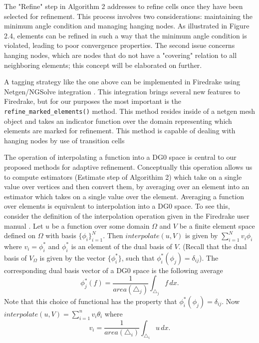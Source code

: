 \documentclass[]{interact}
\theoremstyle{plain}%
\theoremstyle{definition}
\theoremstyle{remark}
\begin{document}
The "Refine" step in Algorithm 2 addresses to refine cells once they have been selected for refinement. This process involves two considerations: maintaining the minimum angle condition and managing hanging nodes. As illustrated in Figure 2.4, elements can be refined in such a way that the minimum angle condition is violated, leading to poor convergence properties. The second issue concerns hanging nodes, which are nodes that do not have a "covering" relation to all neighboring elements; this concept will be elaborated on further.

A tagging strategy like the one above can be implemented in Firedrake using Netgen/NGSolve integration \citep{zerbinati_ngspetsc_nodate}.  This integration brings several new features to Firedrake, but for our purposes the most important is the \texttt{refine\_marked\_elements()} method.  This method resides inside of a netgen mesh object and takes an indicator function over the domain representing which elements are marked for refinement. This method is capable of dealing with hanging nodes by use of transition cells

The operation of interpolating a function into a DG0 space is central to our proposed methods for adaptive refinement. Conceptually this operation allows us to compute estimators (Estimate step of Algorithim 2) which take on a single value over vertices and then convert them, by averaging over an element into an estimator which takes on a single value over the element. Averaging a function over elements is equivalent to interpolation into a DG0 space. To see this, consider the definition of the interpolation operation given in the Firedrake user manual \citep{ham_firedrake_2023}. 
Let $u$ be a function over some domain $\Omega$ and $V$ be a finite element space defined on $\Omega$ with basis $\{\phi_i\}_{i = 1}^N$. Then $interpolate(u, V)$ is given by $\sum_{i = 1}^N v_i \phi_i$ where $v_i = \phi^*_i$ and $\phi^*_i$ is an element of the dual basis of $V$. (Recall that the dual basis of $V_\Omega$ is given by the vector $\{\phi^*_i\}$, such that $\phi^*_i(\phi_j) = \delta_{ij}$). The corresponding dual basis vector of a DG0 space is the following average
\begin{equation}
  \phi_j^*(f) = \frac{1}{area(\triangle_j)}\int_{\triangle_j} f\, dx.
\end{equation}
Note that this choice of functional has the property that $\phi^*_i(\phi_j) = \delta_{ij}$. Now $interpolate(u, V) = \sum_{i = 1}^n v_i\theta_i$ where
\begin{equation}
  v_i = \frac{1}{area(\triangle_i)}\int_{\triangle_i} u \, dx.
\end{equation}
\end{document}
